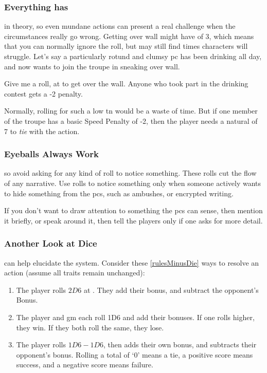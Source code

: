 \begin{multicols}{2}
\subsubsection{Everything has }
in theory, so even mundane actions can present a real challenge when the circumstances really go wrong.
Getting over  wall might have  of 3, which means that you can normally ignore the roll, but may still find times characters will struggle.
Let's say a particularly rotund and clumsy \gls{pc} has been drinking all day, and now wants to join the troupe in sneaking over  wall.

\begin{speechtext}
  Give me a  roll, at \tn[3] to get over the wall.
  Anyone who took part in the drinking contest gets a -2 penalty.
\end{speechtext}

Normally, rolling for such a low \gls{tn} would be a waste of time.
But if one member of the troupe has a basic Speed Penalty of -2, then the player needs a \gls{natural} of 7 to \emph{tie} with the action.

\subsubsection{Eyeballs Always Work}
so avoid asking for any kind of roll to notice something.
These rolls cut the flow of any narrative.
Use rolls to notice something only when someone actively wants to hide something from the \glspl{pc}, such as ambushes, or encrypted writing.

If you don't want to draw attention to something the \glspl{pc} can sense, then mention it briefly, or speak around it, then tell the players only if one asks for more detail.

\subsubsection{Another Look at Dice}
can help elucidate the system.
Consider these \ref{rulesMinusDie} ways to resolve an action (assume all \glspl{trait} remain unchanged):

\begin{enumerate}
  \item
  The player rolls $2D6$ at \tn[7].
  They add their bonus, and subtract the opponent's Bonus.
  \label{rulesMinusOpponent}
  \item
  The player and \gls{gm} each roll 1D6 and add their bonuses.
  If one rolls higher, they win.
  If they both roll the same, they lose.
  \label{rulesTwoRolls}
  \item
  The player rolls $1D6-1D6$, then adds their own bonus, and subtracts their opponent's bonus.
  Rolling a total of `0' means a tie, a positive score means success, and a negative score means failure.
  \label{rulesMinusDie}
\end{enumerate}


\end{multicols}
